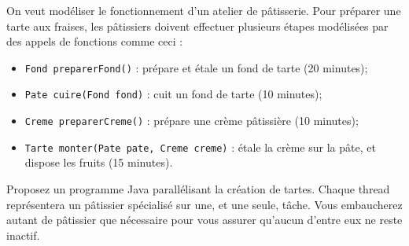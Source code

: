 
\begingroup

\begin{exercice}
  \label{exo:blocking/pipeline}

  On veut modéliser le fonctionnement d'un atelier de pâtisserie.
  Pour préparer une tarte aux fraises, les pâtissiers doivent
  effectuer plusieurs étapes modélisées par des appels de fonctions comme ceci :

  \begin{itemize}
  \item \lstinline{Fond preparerFond()} : prépare et étale un fond de tarte (20 minutes);
  \item \lstinline{Pate cuire(Fond fond)} : cuit un fond de tarte (10 minutes);
  \item \lstinline{Creme preparerCreme()} : prépare une crème pâtissière (10 minutes);
  \item \lstinline{Tarte monter(Pate pate, Creme creme)} : étale la crème sur la pâte, et dispose les fruits (15 minutes).
  \end{itemize}

  \begin{questions}
  \item Proposez un programme Java parallélisant la création de tartes.
    Chaque thread représentera un pâtissier spécialisé sur une, et une seule, tâche.
    Vous embaucherez autant de pâtissier que nécessaire pour vous
    assurer qu'aucun d'entre eux ne reste inactif. 
  \end{questions}

\end{exercice}

\endgroup
\endinput
